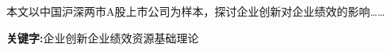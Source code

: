 \begin{cnabstract}

    本文以中国沪深两市A股上市公司为样本，探讨企业创新对企业绩效的影响……
    
    \par\textbf{关键字:}企业创新\hspace{1em}企业绩效\hspace{1em}资源基础理论
\end{cnabstract}
